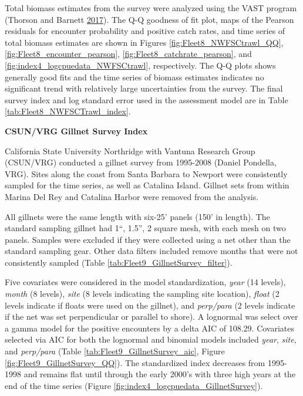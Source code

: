 \documentclass[12pt,]{article}
\begin{document}
Total biomass estimates from the survey were analyzed using the VAST
program (Thorson and Barnett \protect\hyperlink{ref-Thorson2017}{2017}).
The Q-Q goodness of fit plot, maps of the Pearson residuals for
encounter probability and positive catch rates, and time series of total
biomass estimates are shown in Figures \ref{fig:Fleet8_NWFSCtrawl_QQ},
\ref{fig:Fleet8_encounter_pearson}, \ref{fig:Fleet8_catchrate_pearson},
and \ref{fig:index4_logcpuedata_NWFSCtrawl}, respectively. The Q-Q plots
shows generally good fits and the time series of biomass estimates
indicates no significant trend with relatively large uncertainties from
the survey. The final survey index and log standard error used in the
assessment model are in Table \ref{tab:Fleet8_NWFSCTrawl_index}.

\textbf{CSUN/VRG Gillnet Survey Index}

California State University Northridge with Vantuna Research Group
(CSUN/VRG) conducted a gillnet survey from 1995-2008 (Daniel Pondella,
VRG). Sites along the coast from Santa Barbara to Newport were
consistently sampled for the time series, as well as Catalina Island.
Gillnet sets from within Marina Del Rey and Catalina Harbor were removed
from the analysis.

All gillnets were the same length with six-25' panels (150' in length).
The standard sampling gillnet had 1``, 1.5'', 2 square mesh, with each
mesh on two panels. Samples were excluded if they were collected using a
net other than the standard sampling gear. Other data filters included
remove months that were not consistently sampled (Table
\ref{tab:Fleet9_GillnetSurvey_filter}).

Five covariates were considered in the model standardization,
\emph{year} (14 levels), \emph{month} (8 levels), \emph{site} (8 levels
indicating the sampling site location), \emph{float} (2 levels indicate
if floats were used on the gillnet), and \emph{perp/para} (2 levels
indicate if the net was set perpendicular or parallel to shore). A
lognormal was select over a gamma model for the positive encounters by a
delta AIC of 108.29. Covariates selected via AIC for both the lognormal
and binomial models included \emph{year}, \emph{site}, and
\emph{perp/para} (Table \ref{tab:Fleet9_GillnetSurvey_aic}, Figure
\ref{fig:Fleet9_GillnetSurvey_QQ}). The standardized index decreases
from 1995-1998 and remains flat until through the early 2000's with
three high years at the end of the time series (Figure
\ref{fig:index4_logcpuedata_GillnetSurvey}).
\end{document}
